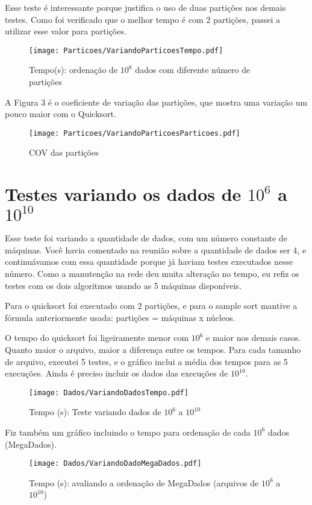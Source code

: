 \documentclass[12pt,a4paper]{article}
\begin{document}
Esse teste é interessante porque justifica o uso de duas partições nos demais testes. Como foi verificado que o melhor tempo é com 2 partições, passei a utilizar esse valor para partições. \\
 
\begin{figure}[!htb]
\texttt{[image: Particoes/VariandoParticoesTempo.pdf]} 
\caption{Tempo(s): ordenação de $10^8$ dados com diferente número de partições}
\end{figure}

A Figura 3 é o coeficiente de variação das partições, que mostra uma variação um pouco maior com o Quicksort. 
\begin{figure}[!htb]
\texttt{[image: Particoes/VariandoParticoesParticoes.pdf]} 
\caption{COV das partições}
\end{figure}


\newpage

\section{Testes variando os dados de $10^6$ a $10^{10}$}

Esse teste foi variando a quantidade de dados, com um número constante de máquinas.
Você havia comentado na reunião sobre a quantidade de dados ser 4, e continuávamos com essa quantidade porque
já haviam testes executados nesse número. Como a manutenção na rede deu muita alteração no tempo,
eu refiz os testes com os dois algoritmos usando as 5 máquinas disponíveis. 

Para o quicksort foi executado com 2 partições, e para o sample sort mantive a fórmula anteriormente usada:
partições = máquinas x núcleos. 

O tempo do quicksort foi ligeiramente menor com $10^6$ e  maior nos demais casos. Quanto maior o arquivo, maior a diferença entre os tempos. 
Para cada tamanho de arquivo, executei 5 testes, e o gráfico inclui a média dos tempos para as 5 execuções. Ainda é preciso incluir os dados das execuções de $10^{10}$.

\begin{figure}[!htb]
\texttt{[image: Dados/VariandoDadosTempo.pdf]} 
\caption{Tempo (s): Teste variando dados de $10^6$ a $10^{10}$}
\end{figure}

Fiz também um gráfico incluindo o tempo para ordenação de cada $10^6$ dados (MegaDados). 
\begin{figure}[!htb]
\texttt{[image: Dados/VariandoDadoMegaDados.pdf]} 
\caption{Tempo (s): avaliando a ordenação de MegaDados (arquivos de $10^6$ a $10^{10}$) }
\end{figure}
\end{document}
